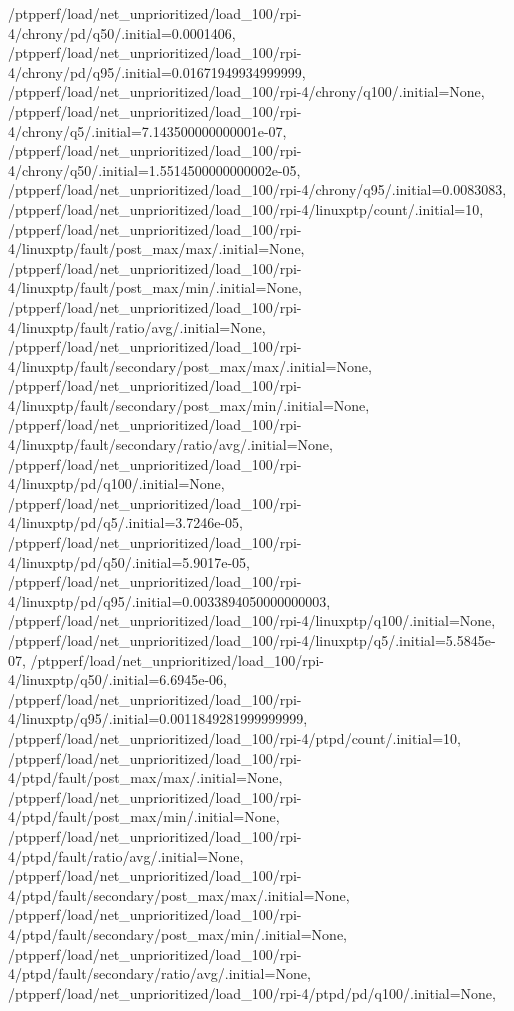 {    /ptpperf/load/net_unprioritized/load_100/rpi-4/chrony/pd/q50/.initial=0.0001406,
    /ptpperf/load/net_unprioritized/load_100/rpi-4/chrony/pd/q95/.initial=0.01671949934999999,
    /ptpperf/load/net_unprioritized/load_100/rpi-4/chrony/q100/.initial=None,
    /ptpperf/load/net_unprioritized/load_100/rpi-4/chrony/q5/.initial=7.143500000000001e-07,
    /ptpperf/load/net_unprioritized/load_100/rpi-4/chrony/q50/.initial=1.5514500000000002e-05,
    /ptpperf/load/net_unprioritized/load_100/rpi-4/chrony/q95/.initial=0.0083083,
    /ptpperf/load/net_unprioritized/load_100/rpi-4/linuxptp/count/.initial=10,
    /ptpperf/load/net_unprioritized/load_100/rpi-4/linuxptp/fault/post_max/max/.initial=None,
    /ptpperf/load/net_unprioritized/load_100/rpi-4/linuxptp/fault/post_max/min/.initial=None,
    /ptpperf/load/net_unprioritized/load_100/rpi-4/linuxptp/fault/ratio/avg/.initial=None,
    /ptpperf/load/net_unprioritized/load_100/rpi-4/linuxptp/fault/secondary/post_max/max/.initial=None,
    /ptpperf/load/net_unprioritized/load_100/rpi-4/linuxptp/fault/secondary/post_max/min/.initial=None,
    /ptpperf/load/net_unprioritized/load_100/rpi-4/linuxptp/fault/secondary/ratio/avg/.initial=None,
    /ptpperf/load/net_unprioritized/load_100/rpi-4/linuxptp/pd/q100/.initial=None,
    /ptpperf/load/net_unprioritized/load_100/rpi-4/linuxptp/pd/q5/.initial=3.7246e-05,
    /ptpperf/load/net_unprioritized/load_100/rpi-4/linuxptp/pd/q50/.initial=5.9017e-05,
    /ptpperf/load/net_unprioritized/load_100/rpi-4/linuxptp/pd/q95/.initial=0.0033894050000000003,
    /ptpperf/load/net_unprioritized/load_100/rpi-4/linuxptp/q100/.initial=None,
    /ptpperf/load/net_unprioritized/load_100/rpi-4/linuxptp/q5/.initial=5.5845e-07,
    /ptpperf/load/net_unprioritized/load_100/rpi-4/linuxptp/q50/.initial=6.6945e-06,
    /ptpperf/load/net_unprioritized/load_100/rpi-4/linuxptp/q95/.initial=0.0011849281999999999,
    /ptpperf/load/net_unprioritized/load_100/rpi-4/ptpd/count/.initial=10,
    /ptpperf/load/net_unprioritized/load_100/rpi-4/ptpd/fault/post_max/max/.initial=None,
    /ptpperf/load/net_unprioritized/load_100/rpi-4/ptpd/fault/post_max/min/.initial=None,
    /ptpperf/load/net_unprioritized/load_100/rpi-4/ptpd/fault/ratio/avg/.initial=None,
    /ptpperf/load/net_unprioritized/load_100/rpi-4/ptpd/fault/secondary/post_max/max/.initial=None,
    /ptpperf/load/net_unprioritized/load_100/rpi-4/ptpd/fault/secondary/post_max/min/.initial=None,
    /ptpperf/load/net_unprioritized/load_100/rpi-4/ptpd/fault/secondary/ratio/avg/.initial=None,
    /ptpperf/load/net_unprioritized/load_100/rpi-4/ptpd/pd/q100/.initial=None,
}
